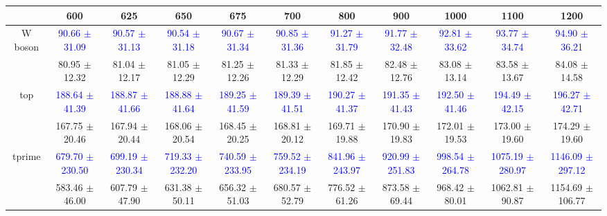 {
\renewcommand{\arraystretch}{1.0}
\begin{center}
\begin{small}
\begin{tabular}{ccccccccccc}
\hline\hline
 & 600 & 625 & 650 & 675 & 700 & 800 & 900 & 1000 & 1100 & 1200 \\
\hline
\multirow{2}{*}{W boson} & \textcolor{blue}{90.66 $\pm$ 31.09} & \textcolor{blue}{90.57 $\pm$ 31.13} & \textcolor{blue}{90.54 $\pm$ 31.18} & \textcolor{blue}{90.67 $\pm$ 31.34} & \textcolor{blue}{90.85 $\pm$ 31.36} & \textcolor{blue}{91.27 $\pm$ 31.79} & \textcolor{blue}{91.77 $\pm$ 32.48} & \textcolor{blue}{92.81 $\pm$ 33.62} & \textcolor{blue}{93.77 $\pm$ 34.74} & \textcolor{blue}{94.90 $\pm$ 36.21} \\
 & \textcolor{myred}{80.95 $\pm$ 12.32} & \textcolor{myred}{81.04 $\pm$ 12.17} & \textcolor{myred}{81.05 $\pm$ 12.29} & \textcolor{myred}{81.25 $\pm$ 12.26} & \textcolor{myred}{81.33 $\pm$ 12.29} & \textcolor{myred}{81.85 $\pm$ 12.42} & \textcolor{myred}{82.48 $\pm$ 12.76} & \textcolor{myred}{83.08 $\pm$ 13.14} & \textcolor{myred}{83.58 $\pm$ 13.67} & \textcolor{myred}{84.08 $\pm$ 14.58} \\
\hline
\multirow{2}{*}{top} & \textcolor{blue}{188.64 $\pm$ 41.39} & \textcolor{blue}{188.87 $\pm$ 41.66} & \textcolor{blue}{188.88 $\pm$ 41.64} & \textcolor{blue}{189.25 $\pm$ 41.59} & \textcolor{blue}{189.39 $\pm$ 41.51} & \textcolor{blue}{190.27 $\pm$ 41.37} & \textcolor{blue}{191.35 $\pm$ 41.43} & \textcolor{blue}{192.50 $\pm$ 41.46} & \textcolor{blue}{194.49 $\pm$ 42.15} & \textcolor{blue}{196.27 $\pm$ 42.71} \\
 & \textcolor{myred}{167.75 $\pm$ 20.46} & \textcolor{myred}{167.94 $\pm$ 20.44} & \textcolor{myred}{168.06 $\pm$ 20.54} & \textcolor{myred}{168.45 $\pm$ 20.25} & \textcolor{myred}{168.81 $\pm$ 20.12} & \textcolor{myred}{169.71 $\pm$ 19.88} & \textcolor{myred}{170.90 $\pm$ 19.83} & \textcolor{myred}{172.01 $\pm$ 19.53} & \textcolor{myred}{173.00 $\pm$ 19.60} & \textcolor{myred}{174.29 $\pm$ 19.60} \\
\hline
\multirow{2}{*}{tprime} & \textcolor{blue}{679.70 $\pm$ 230.50} & \textcolor{blue}{699.19 $\pm$ 230.34} & \textcolor{blue}{719.33 $\pm$ 232.20} & \textcolor{blue}{740.59 $\pm$ 233.95} & \textcolor{blue}{759.52 $\pm$ 234.19} & \textcolor{blue}{841.96 $\pm$ 243.97} & \textcolor{blue}{920.99 $\pm$ 251.83} & \textcolor{blue}{998.54 $\pm$ 264.78} & \textcolor{blue}{1075.19 $\pm$ 280.97} & \textcolor{blue}{1146.09 $\pm$ 297.12} \\
 & \textcolor{myred}{583.46 $\pm$ 46.00} & \textcolor{myred}{607.79 $\pm$ 47.90} & \textcolor{myred}{631.38 $\pm$ 50.11} & \textcolor{myred}{656.32 $\pm$ 51.03} & \textcolor{myred}{680.57 $\pm$ 52.79} & \textcolor{myred}{776.52 $\pm$ 61.26} & \textcolor{myred}{873.58 $\pm$ 69.44} & \textcolor{myred}{968.42 $\pm$ 80.01} & \textcolor{myred}{1062.81 $\pm$ 90.87} & \textcolor{myred}{1154.69 $\pm$ 106.77} \\
\hline\hline
\end{tabular}
\end{small}
\end{center}
}

